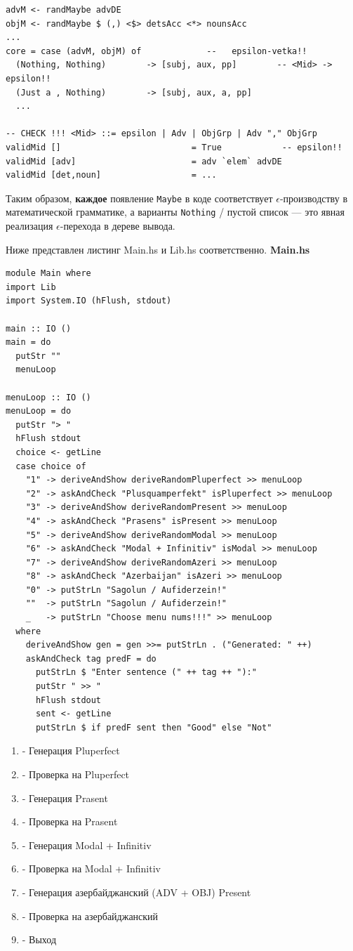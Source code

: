 \documentclass[areasetadvanced]{scrartcl}
\begin{document}
\begin{lstlisting}[mathescape,caption={Фрагмент реализации $\epsilon$-перехода}]
advM <- randMaybe advDE
objM <- randMaybe $ (,) <$> detsAcc <*> nounsAcc
...
core = case (advM, objM) of             --   epsilon-vetka!!
  (Nothing, Nothing)        -> [subj, aux, pp]        -- <Mid> -> epsilon!!
  (Just a , Nothing)        -> [subj, aux, a, pp]
  ...

-- CHECK !!! <Mid> ::= epsilon | Adv | ObjGrp | Adv "," ObjGrp
validMid []                          = True            -- epsilon!!
validMid [adv]                       = adv `elem` advDE
validMid [det,noun]                  = ...
\end{lstlisting}

Таким образом, \textbf{каждое} появление \texttt{Maybe} в коде
соответствует $\epsilon$-производству в математической грамматике,
а варианты \texttt{Nothing} / пустой список — это явная реализация
$\epsilon$-перехода в дереве вывода.

Ниже представлен листинг Main.hs и Lib.hs соответственно.
\textbf{Main.hs}
\begin{lstlisting}
module Main where
import Lib
import System.IO (hFlush, stdout)

main :: IO ()
main = do
  putStr ""
  menuLoop

menuLoop :: IO ()
menuLoop = do
  putStr "> "
  hFlush stdout
  choice <- getLine
  case choice of
    "1" -> deriveAndShow deriveRandomPluperfect >> menuLoop
    "2" -> askAndCheck "Plusquamperfekt" isPluperfect >> menuLoop
    "3" -> deriveAndShow deriveRandomPresent >> menuLoop
    "4" -> askAndCheck "Prasens" isPresent >> menuLoop
    "5" -> deriveAndShow deriveRandomModal >> menuLoop
    "6" -> askAndCheck "Modal + Infinitiv" isModal >> menuLoop
    "7" -> deriveAndShow deriveRandomAzeri >> menuLoop
    "8" -> askAndCheck "Azerbaijan" isAzeri >> menuLoop
    "0" -> putStrLn "Sagolun / Aufiderzein!"
    ""  -> putStrLn "Sagolun / Aufiderzein!"
    _   -> putStrLn "Choose menu nums!!!" >> menuLoop
  where
    deriveAndShow gen = gen >>= putStrLn . ("Generated: " ++)
    askAndCheck tag predF = do
      putStrLn $ "Enter sentence (" ++ tag ++ "):"
      putStr " >> "
      hFlush stdout
      sent <- getLine
      putStrLn $ if predF sent then "Good" else "Not"
\end{lstlisting}
\begin{enumerate}
	\item - Генерация Pluperfect
	\item - Проверка на Pluperfect
	\item - Генерация Prasent
	\item - Проверка на Prasent
	\item - Генерация Modal + Infinitiv
	\item - Проверка на Modal + Infinitiv
	\item - Генерация азербайджанский (ADV + OBJ) Present
	\item - Проверка на азербайджанский
	\item - Выход
\end{enumerate}
\end{document}
